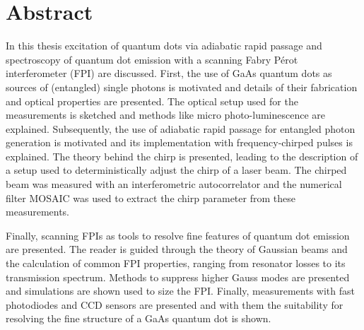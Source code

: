 

\chapter*{Abstract}
\label{cha:abstract}


In this thesis excitation of quantum dots via adiabatic rapid passage and spectroscopy of quantum dot emission with a scanning Fabry Pérot interferometer (FPI) are discussed.
First, the use of GaAs quantum dots as sources of (entangled) single photons is motivated and details of their fabrication and optical properties are presented.
The optical setup used for the measurements is sketched and methods like micro photo-luminescence are explained.
Subsequently, the use of adiabatic rapid passage for entangled photon generation is motivated and its implementation with frequency-chirped pulses is explained.
The theory behind the chirp is presented, leading to the description of a setup used to deterministically adjust the chirp of a laser beam.
The chirped beam was measured with an interferometric autocorrelator and the numerical filter MOSAIC was used to extract the chirp parameter from these measurements.

Finally, scanning FPIs as tools to resolve fine features of quantum dot emission are presented.
The reader is guided through the theory of Gaussian beams and the calculation of common FPI properties, ranging from resonator losses to its transmission spectrum.
Methods to suppress higher Gauss modes are presented and simulations are shown used to size the FPI.
Finally, measurements with fast photodiodes and CCD sensors are presented and with them the suitability for resolving the fine structure of a GaAs quantum dot is shown.   

